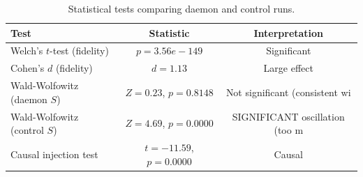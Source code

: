 \begin{table}[h]
\centering
\caption{Statistical tests comparing daemon and control runs.}
\label{tab:stat_tests}
\begin{tabular}{lcc}
\hline
Test & Statistic & Interpretation \\
\hline
  Welch's $t$-test (fidelity) & $p = 3.56e-149$ & Significant \\
  Cohen's $d$ (fidelity) & $d = 1.13$ & Large effect \\
  Wald-Wolfowitz (daemon $S$) & $Z = 0.23$, $p = 0.8148$ & Not significant (consistent wi \\
  Wald-Wolfowitz (control $S$) & $Z = 4.69$, $p = 0.0000$ & SIGNIFICANT oscillation (too m \\
  Causal injection test & $t = -11.59$, $p = 0.0000$ & Causal \\
\hline
\end{tabular}
\end{table}